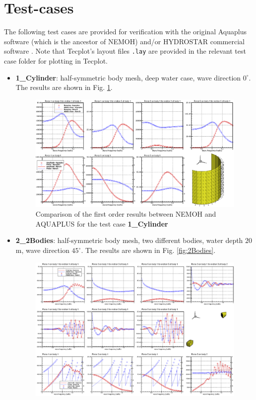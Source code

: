\documentclass[12pt,a4paper,titlepage]{article}
\begin{document}
\section{Test-cases}\label{Sec:Testcase}
The following test cases are provided for verification with the original Aquaplus software (which is the ancestor of NEMOH) and/or HYDROSTAR commercial software \cite{HYDROSTAR}. Note that Tecplot's layout files \texttt{.lay} are provided in the relevant test case folder for plotting in Tecplot.
\begin{itemize}
\item {\textbf{1\_Cylinder}}: half-symmetric body mesh, deep water case, wave direction $0^{\circ}$. The results are shown in Fig. \ref{fig:Cylinder}.
\begin{figure}[h!t]
\centering
\includegraphics[width=\textwidth,trim = 0mm 0mm 0mm 0mm, clip]{figures/Ver_Cylinder.eps}
\caption{Comparison of the first order results between NEMOH and AQUAPLUS for the test case \textbf{1\_Cylinder}}\label{fig:Cylinder}
\end{figure}
\item \textbf{2\_2Bodies}: half-symmetric body mesh, two different bodies, water depth $20$ m, wave direction $45^{\circ}$. The results are shown in Fig. \ref{fig:2Bodies}.
\begin{figure}[h!t]
\centering
\includegraphics[width=\textwidth,trim = 0mm 0mm 0mm 0mm, clip]{figures/Ver_2Bodies.eps}

\end{figure}
\end{itemize}
\end{document}
